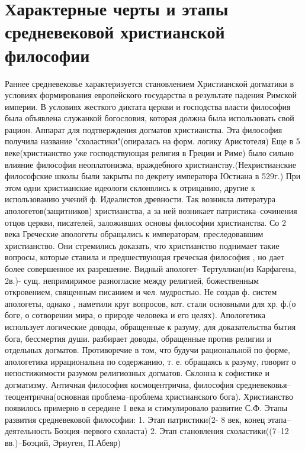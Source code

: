 \documentclass[12pt]{article}
\begin{document}
\newpage
\section{Характерные черты и этапы средневековой христианской философии}
Раннее  средневековье  характеризуется  становлением  Христианской  догматики  в  условиях  формирования
европейского  государства  в  результате  падения  Римской  империи.  В  условиях  жесткого  диктата  церкви  и
господства власти философия была объявлена служанкой богословия, которая должна была использовать свой
рацион.  Аппарат  для  подтверждения  догматов  христианства.  Эта  философия  получила  название
"схоластики"(опиралась на форм. логику Аристотеля)
Еще в 5 веке(христианство уже господствующая религия в Греции и Риме) было сильно влияние философия
неоплатонизма,  враждебного  христианству.(Нехристианские  философские  школы  были  закрыты  по  декрету
императора  Юстиана  в  529г.)  При  этом  одни  христианские  идеологи  склонялись  к  отрицанию,  другие  к 
использованию  учений  ф.  Идеалистов  древности.  Так  возникла  литература  апологетов(защитников)
христианства,  а  за  ней  возникает  патристика–сочинения  отцов  церкви,  писателей,  заложивших  основы
философии христианства.
Со 2 века Греческие апологеты обращались к императорам, преследовавшим христианство. Они стремились
доказать,  что  христианство  поднимает  такие  вопросы,  которые  ставила  и  предшествующая  греческая
философия , но дает более совершенное их разрешение. Видный апологет- Тертуллиан(из Карфагена, 2в.)- сущ.
непримиримое  разногласие  между  религией,  божественным  откровением,  священным  писанием  и  чел.
мудростью. Не создав ф. систем апологеты, однако , наметили круг вопросов, кот. стали основными для хр. ф.(о
боге,  о  сотворении  мира,  о  природе  человека  и  его  целях).  Апологетика  использует  логические  доводы,
обращенные к разуму, для доказательства бытия бога, бессмертия души. разбирает доводы, обращенные против
религии  и  отдельных  догматов.  Противоречие  в  том,  что  будучи  рациональной  по  форме,  апологетика
иррациональна по содержанию, т. е. обращаясь к разуму, говорит о непостижимости разумом религиозных
догматов.
Склонна к софистике и догматизму.
Античная философия космоцентрична, философия средневековья–теоцентрична(основная проблема–проблема
христианского бога). Христианство появилось примерно в середине 1 века и стимулировало развитие С.Ф.
Этапы развития средневековой философии:
1. Этап патристики(2- 8 век, конец этапа–деятельность Боэция–первого схоласта)
2. Этап становления схоластики((7–12 вв.)–Боэций, Эриуген, П.Абеяр)
\end{document}
